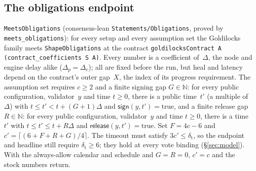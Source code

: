 \documentclass{article}
\begin{document}
\subsection{The obligations endpoint}\label{sec:obligations}

\begin{sloppypar}
\texttt{MeetsObligations} (consensus-lean
\texttt{Statements/Obligations}, proved by
\texttt{meets\_obligations}): for every setup and every assumption set the
Goldilocks family meets \texttt{ShapeObligations} at the contract
\texttt{goldilocksContract A (contract\_coefficients S A)}.  Every number is a
coefficient of~$\Delta$, the node and engine delay alike ($\Delta_p=\Delta_e$);
all are fixed before the run, but heal and latency depend on the contract's
outer gap~$X$, the index of its progress requirement.  The assumption set
requires $c\geq2$ and a finite signing gap $G\in\mathbb{N}$: for every public
configuration, validator~$y$ and time $t\geq0$, there is a public time~$t'$
(a multiple of~$\Delta$) with $t\leq t'<t+(G+1)\Delta$ and
$\mathsf{sign}(y,t')=\mathrm{true}$, and a finite release gap
$R\in\mathbb{N}$: for every public configuration, validator~$y$ and time
$t\geq0$, there is a time~$t'$ with $t\leq t'\leq t+R\Delta$ and
$\mathsf{release}(y,t')=\mathrm{true}$.  Set $F=4c-6$ and
$c'=\lceil(6+F+R+G)/4\rceil$.  The timeout must satisfy
$3c'\leq\delta_{\mathrm t}$, so the endpoint and headline still require
$\delta_{\mathrm t}\geq6$; they hold at every vote binding (\S\ref{sec:model}).
With the always-allow calendar and schedule and $G=R=0$, $c'=c$ and the
stock numbers return.
\end{sloppypar}
\end{document}
